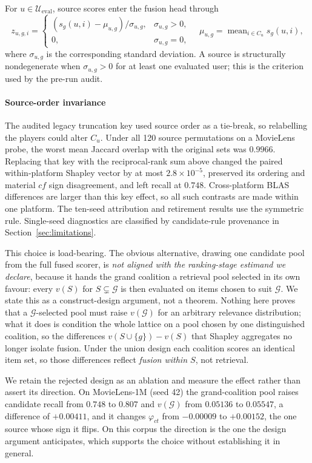 \documentclass[pdflatex,sn-basic,Numbered]{sn-jnl}
\theoremstyle{plain}
\theoremstyle{definition}
\newcommand{\G}{\mathcal{G}}
\newcommand{\Ueval}{\mathcal{U}_{\mathrm{eval}}}
\begin{document}
For $u\in\Ueval$, source scores enter the fusion head through
\begin{equation}
z_{u,g,i}=
\begin{cases}
(s_g(u,i)-\mu_{u,g})/\sigma_{u,g}, & \sigma_{u,g}>0,\\
0, & \sigma_{u,g}=0,
\end{cases}
\quad
\mu_{u,g}=\operatorname{mean}_{i\in C_u}s_g(u,i),
\label{eq:zscore}
\end{equation}
where $\sigma_{u,g}$ is the corresponding standard deviation. A source is
structurally nondegenerate when $\sigma_{u,g}>0$ for at least one evaluated
user; this is the criterion used by the pre-run audit.

\paragraph{Source-order invariance}
The audited legacy truncation key used source order as a tie-break, so
relabelling the players could alter $C_u$. Under all 120 source permutations on
a MovieLens probe, the worst mean Jaccard overlap with the original sets was
$0.9966$. Replacing that key with the reciprocal-rank sum above changed the paired
within-platform Shapley vector by at most $2.8\times10^{-5}$, preserved its
ordering and material $cf$ sign disagreement, and left recall at $0.748$.
Cross-platform BLAS differences are larger than this key effect, so all such
contrasts are made within one platform. The ten-seed attribution and retirement
results use the symmetric rule. Single-seed diagnostics are classified by
candidate-rule provenance in Section~\ref{sec:limitations}.

This choice is load-bearing. The obvious alternative, drawing one candidate
pool from the full fused scorer, is \emph{not aligned with the ranking-stage
estimand we declare}, because it hands the grand coalition a retrieval pool
selected in its own favour: every $v(S)$ for $S \subsetneq \G$ is then
evaluated on items chosen to suit $\G$. We state this as a construct-design
argument, not a theorem. Nothing here proves that a $\G$-selected pool must
raise $v(\G)$ for an arbitrary relevance distribution; what it does is
condition the whole lattice on a pool chosen by one distinguished coalition, so
the differences $v(S \cup \{g\}) - v(S)$ that Shapley aggregates no longer
isolate fusion. Under the union design each coalition scores an identical item
set, so those differences reflect \emph{fusion within $S$}, not retrieval.

We retain the rejected design as an ablation and measure the effect rather than
assert its direction. On MovieLens-1M (seed 42) the grand-coalition pool raises
candidate recall from $0.748$ to $0.807$ and $v(\G)$ from $0.05136$ to
$0.05547$, a difference of $+0.00411$, and it changes $\varphi_{ct}$ from
$-0.00009$ to $+0.00152$, the one source whose sign it flips. On this corpus
the direction is the one the design argument anticipates, which supports the
choice without establishing it in general.
\end{document}

